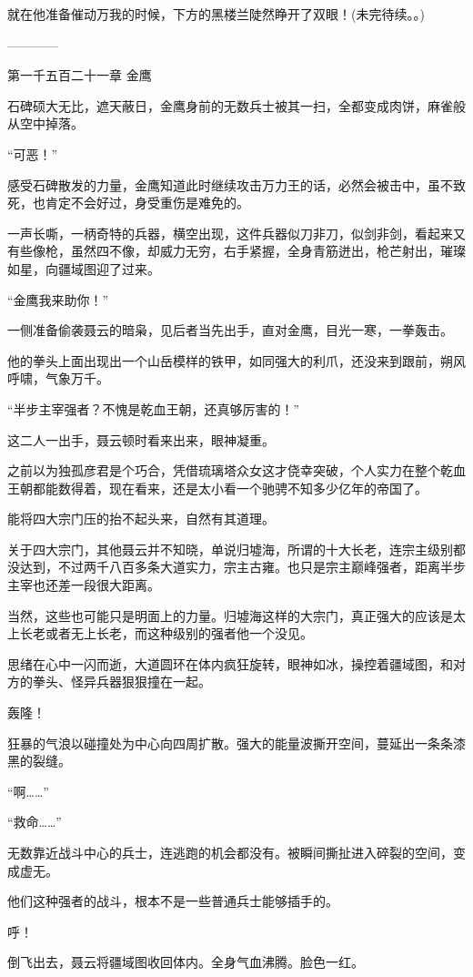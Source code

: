\begin{this_body}
就在他准备催动万我的时候，下方的黑楼兰陡然睁开了双眼！(未完待续。。)

------------

第一千五百二十一章 金鹰

石碑硕大无比，遮天蔽日，金鹰身前的无数兵士被其一扫，全都变成肉饼，麻雀般从空中掉落。

“可恶！”

感受石碑散发的力量，金鹰知道此时继续攻击万力王的话，必然会被击中，虽不致死，也肯定不会好过，身受重伤是难免的。

一声长嘶，一柄奇特的兵器，横空出现，这件兵器似刀非刀，似剑非剑，看起来又有些像枪，虽然四不像，却威力无穷，右手紧握，全身青筋迸出，枪芒射出，璀璨如星，向疆域图迎了过来。

“金鹰我来助你！”

一侧准备偷袭聂云的暗枭，见后者当先出手，直对金鹰，目光一寒，一拳轰击。

他的拳头上面出现出一个山岳模样的铁甲，如同强大的利爪，还没来到跟前，朔风呼啸，气象万千。

“半步主宰强者？不愧是乾血王朝，还真够厉害的！”

这二人一出手，聂云顿时看来出来，眼神凝重。

之前以为独孤彦君是个巧合，凭借琉璃塔众女这才侥幸突破，个人实力在整个乾血王朝都能数得着，现在看来，还是太小看一个驰骋不知多少亿年的帝国了。

能将四大宗门压的抬不起头来，自然有其道理。

关于四大宗门，其他聂云并不知晓，单说归墟海，所谓的十大长老，连宗主级别都没达到，不过两千八百多条大道实力，宗主古雍。也只是宗主巅峰强者，距离半步主宰也还差一段很大距离。

当然，这些也可能只是明面上的力量。归墟海这样的大宗门，真正强大的应该是太上长老或者无上长老，而这种级别的强者他一个没见。

思绪在心中一闪而逝，大道圆环在体内疯狂旋转，眼神如冰，操控着疆域图，和对方的拳头、怪异兵器狠狠撞在一起。

轰隆！

狂暴的气浪以碰撞处为中心向四周扩散。强大的能量波撕开空间，蔓延出一条条漆黑的裂缝。

“啊……”

“救命……”

无数靠近战斗中心的兵士，连逃跑的机会都没有。被瞬间撕扯进入碎裂的空间，变成虚无。

他们这种强者的战斗，根本不是一些普通兵士能够插手的。

呼！

倒飞出去，聂云将疆域图收回体内。全身气血沸腾。脸色一红。


\end{this_body}
